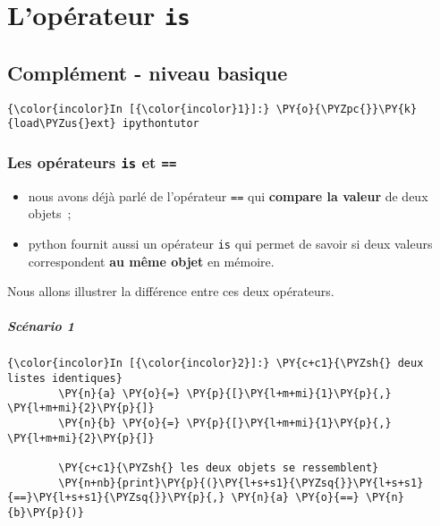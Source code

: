     
    
    
    

    

    \hypertarget{lopuxe9rateur-is}{%
\section{\texorpdfstring{L'opérateur
\texttt{is}}{L'opérateur is}}\label{lopuxe9rateur-is}}

    \hypertarget{compluxe9ment---niveau-basique}{%
\subsection{Complément - niveau
basique}\label{compluxe9ment---niveau-basique}}

    \begin{Verbatim}[commandchars=\\\{\}]
{\color{incolor}In [{\color{incolor}1}]:} \PY{o}{\PYZpc{}}\PY{k}{load\PYZus{}ext} ipythontutor
\end{Verbatim}


    \hypertarget{les-opuxe9rateurs-is-et}{%
\subsubsection{\texorpdfstring{Les opérateurs \texttt{is} et
\texttt{==}}{Les opérateurs is et ==}}\label{les-opuxe9rateurs-is-et}}

    \begin{itemize}
\tightlist
\item
  nous avons déjà parlé de l'opérateur \texttt{==} qui \textbf{compare
  la valeur} de deux objets~;
\item
  python fournit aussi un opérateur \texttt{is} qui permet de savoir si
  deux valeurs correspondent \textbf{au même objet} en mémoire.
\end{itemize}

Nous allons illustrer la différence entre ces deux opérateurs.

    \hypertarget{scuxe9nario-1}{%
\subparagraph{Scénario 1}\label{scuxe9nario-1}}

    \begin{Verbatim}[commandchars=\\\{\}]
{\color{incolor}In [{\color{incolor}2}]:} \PY{c+c1}{\PYZsh{} deux listes identiques}
        \PY{n}{a} \PY{o}{=} \PY{p}{[}\PY{l+m+mi}{1}\PY{p}{,} \PY{l+m+mi}{2}\PY{p}{]}
        \PY{n}{b} \PY{o}{=} \PY{p}{[}\PY{l+m+mi}{1}\PY{p}{,} \PY{l+m+mi}{2}\PY{p}{]}
        
        \PY{c+c1}{\PYZsh{} les deux objets se ressemblent}
        \PY{n+nb}{print}\PY{p}{(}\PY{l+s+s1}{\PYZsq{}}\PY{l+s+s1}{==}\PY{l+s+s1}{\PYZsq{}}\PY{p}{,} \PY{n}{a} \PY{o}{==} \PY{n}{b}\PY{p}{)}
\end{Verbatim}


